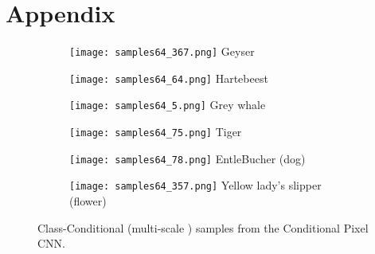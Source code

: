 \documentclass{article}
\begin{document}
\newpage
\section*{Appendix}

\vspace{1cm}
\begin{figure*}[h]

\begin{subfigure}{0.98\textwidth}
  \centering
  \texttt{[image: samples64\_367.png]}
  Geyser
\end{subfigure}\vspace{6pt}
\begin{subfigure}{0.98\textwidth}
  \centering
  \texttt{[image: samples64\_64.png]}
  Hartebeest
\end{subfigure}\vspace{6pt}
\begin{subfigure}{0.98\textwidth}
  \centering
  \texttt{[image: samples64\_5.png]}
  Grey whale
\end{subfigure}\vspace{6pt}
\begin{subfigure}{0.98\textwidth}
  \centering
  \texttt{[image: samples64\_75.png]}
  Tiger
\end{subfigure}\vspace{6pt}
\begin{subfigure}{0.98\textwidth}
  \centering
  \texttt{[image: samples64\_78.png]}
  EntleBucher (dog)
\end{subfigure}\vspace{6pt}
\begin{subfigure}{0.98\textwidth}
  \centering
  \texttt{[image: samples64\_357.png]}
  Yellow lady's slipper (flower)
\end{subfigure}\vspace{6pt}

\caption{Class-Conditional (multi-scale ) samples from the Conditional Pixel CNN.}
\end{figure*}
\end{document}
